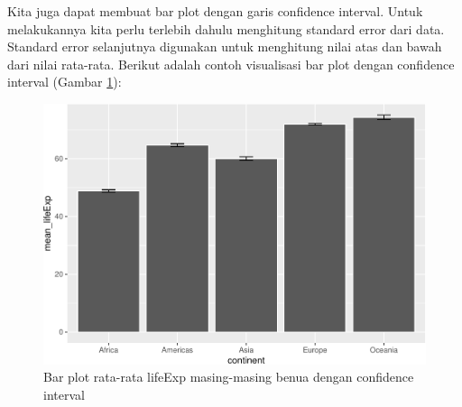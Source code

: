\documentclass[]{book}
\newenvironment{Shaded}{\begin{snugshade}}{\end{snugshade}}
\newcommand{\KeywordTok}[1]{\textcolor[rgb]{0.13,0.29,0.53}{\textbf{#1}}}
\newcommand{\DataTypeTok}[1]{\textcolor[rgb]{0.13,0.29,0.53}{#1}}
\newcommand{\FloatTok}[1]{\textcolor[rgb]{0.00,0.00,0.81}{#1}}
\newcommand{\StringTok}[1]{\textcolor[rgb]{0.31,0.60,0.02}{#1}}
\newcommand{\CommentTok}[1]{\textcolor[rgb]{0.56,0.35,0.01}{\textit{#1}}}
\newcommand{\OperatorTok}[1]{\textcolor[rgb]{0.81,0.36,0.00}{\textbf{#1}}}
\newcommand{\NormalTok}[1]{#1}
\begin{document}
Kita juga dapat membuat bar plot dengan garis confidence interval. Untuk
melakukannya kita perlu terlebih dahulu menghitung standard error dari
data. Standard error selanjutnya digunakan untuk menghitung nilai atas
dan bawah dari nilai rata-rata. Berikut adalah contoh visualisasi bar
plot dengan confidence interval (Gambar \ref{fig:ggbar2}):

\begin{Shaded}
\end{Shaded}

\begin{figure}

{\centering \includegraphics[width=0.7\linewidth]{EnvStat_files/figure-latex/ggbar2-1} 

}

\caption{Bar plot rata-rata lifeExp masing-masing benua dengan confidence interval}\label{fig:ggbar2}
\end{figure}
\end{document}
